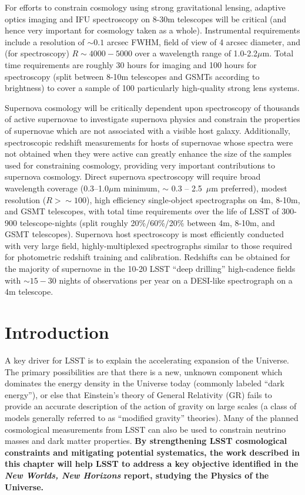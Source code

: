 \documentclass[12pt]{report}
\begin{document}
For efforts to constrain cosmology using strong gravitational lensing, adaptive optics imaging and IFU spectroscopy on 8-30m telescopes will be critical (and hence very important for cosmology taken as a whole).  Instrumental requirements include a resolution of $\sim 0.1$ arcsec FWHM, field of view of 4 arcsec diameter, and (for spectroscopy) $R \sim 4000 - 5000$ over a wavelength range of 1.0-2.2$\mu$m.   Total time requirements are roughly 30 hours for imaging and 100 hours for spectroscopy (split between 8-10m telescopes and GSMTs according to brightness) to cover a sample of 100 particularly high-quality strong lens systems.

Supernova cosmology will be critically dependent upon spectroscopy of thousands of active supernovae to investigate supernova physics and constrain the properties of supernovae which are not associated with a visible host galaxy.  Additionally, spectroscopic redshift measurements for hosts of supernovae whose spectra were not obtained when they were active can greatly enhance the size of the samples used for constraining cosmology, providing very important contributions to supernova cosmology.  Direct supernova spectroscopy will require broad wavelength coverage (0.3--1.0$\mu$m minimum, $\sim$ 0.3 -- 2.5~$\mu$m preferred), modest resolution ($R>\sim 100$), high efficiency single-object spectrographs on 4m, 8-10m, and GSMT telescopes, with total time requirements over the life of LSST of 300-900 telescope-nights (split roughly 20\%/60\%/20\% between 4m, 8-10m, and GSMT telescopes).  Supernova host spectroscopy is most efficiently conducted with very large field, highly-multiplexed spectrographs similar to those required for photometric redshift training and calibration. Redshifts can be obtained for the majority of supernovae in the 10-20 LSST ``deep drilling'' high-cadence fields with $\sim 15-30$ nights of observations per year on a DESI-like spectrograph on a 4m telescope.

\section{Introduction}

A key driver for LSST is to explain the accelerating expansion of the Universe.  The primary possibilities are that there is a new, unknown component which dominates the energy density in the Universe today (commonly labeled ``dark energy''), or else that Einstein's theory of General Relativity (GR) fails to provide an accurate description of the action of gravity on large scales (a class of models generally referred to as ``modified gravity'' theories).  Many of the planned cosmological measurements from LSST can also be used to constrain neutrino masses and dark matter properties.  {\bf By strengthening LSST cosmological constraints and mitigating potential systematics, the work described in this chapter will help LSST to address a key objective identified in the {\it New Worlds, New Horizons} report, studying the Physics of the Universe.}
\end{document}

